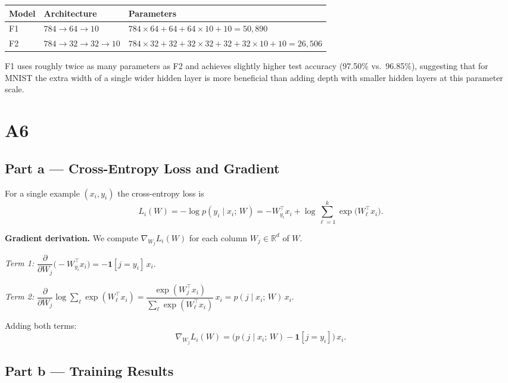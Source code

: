 \documentclass{article}
\begin{document}
\begin{center}
\begin{tabular}{lll}
\toprule
Model & Architecture & Parameters \\
\midrule
F1 & $784\!\to\!64\!\to\!10$ & $784\times64+64+64\times10+10 = 50{,}890$ \\
F2 & $784\!\to\!32\!\to\!32\!\to\!10$ & $784\times32+32+32\times32+32+32\times10+10 = 26{,}506$ \\
\bottomrule
\end{tabular}
\end{center}

F1 uses roughly twice as many parameters as F2 and achieves slightly higher test
accuracy (97.50\% vs.\ 96.85\%), suggesting that for MNIST the extra width of a
single wider hidden layer is more beneficial than adding depth with smaller hidden
layers at this parameter scale.

\clearpage

\section*{A6}

\subsection*{Part a — Cross-Entropy Loss and Gradient}

For a single example $(x_i, y_i)$ the cross-entropy loss is
\[
  L_i(W) = -\log p(y_i \mid x_i;\,W)
          = -W_{y_i}^\top x_i + \log\!\sum_{\ell=1}^{k} \exp\!\bigl(W_\ell^\top x_i\bigr).
\]

\textbf{Gradient derivation.}
We compute $\nabla_{W_j} L_i(W)$ for each column $W_j \in \mathbb{R}^d$ of $W$.

\textit{Term 1:} $\dfrac{\partial}{\partial W_j}\bigl(-W_{y_i}^\top x_i\bigr) = -\mathbf{1}[j = y_i]\,x_i.$

\textit{Term 2:} $\dfrac{\partial}{\partial W_j}\log\!\displaystyle\sum_\ell \exp(W_\ell^\top x_i)
  = \dfrac{\exp(W_j^\top x_i)}{\displaystyle\sum_\ell \exp(W_\ell^\top x_i)}\,x_i
  = p(j \mid x_i;\,W)\,x_i.$

Adding both terms:
\[
  \boxed{\nabla_{W_j} L_i(W) = \bigl(p(j \mid x_i;\,W) - \mathbf{1}[j = y_i]\bigr)\,x_i.}
\]

\subsection*{Part b — Training Results}
\end{document}
